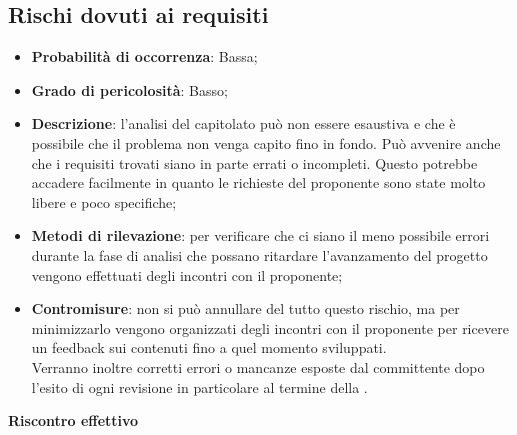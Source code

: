 

	\subsection{Rischi dovuti ai requisiti} %
	\label{sub:rischi_dovuti_ai_requisiti}
		\begin{itemize}
			\item \textbf{Probabilità di occorrenza}: Bassa;
			\item \textbf{Grado di pericolosità}: Basso;
			\item \textbf{Descrizione}: l'analisi del capitolato può non essere esaustiva e che è possibile che il problema non venga capito fino in fondo. Può avvenire anche che i requisiti trovati siano in parte errati o incompleti. Questo potrebbe accadere facilmente in quanto le richieste del proponente sono state molto libere e poco specifiche;
			\item \textbf{Metodi di rilevazione}: per verificare che ci siano il meno possibile errori durante la fase di analisi che possano ritardare l'avanzamento del progetto vengono effettuati degli incontri con il proponente;
			\item \textbf{Contromisure}: non si può annullare del tutto questo rischio, ma per minimizzarlo vengono organizzati degli incontri con il proponente per ricevere un feedback sui contenuti fino a quel momento sviluppati. \\
			Verranno inoltre corretti errori o mancanze esposte dal committente dopo l'esito di ogni revisione in particolare al termine della \RR.			
		\end{itemize}
	\noindent
	\textbf{Riscontro effettivo}
